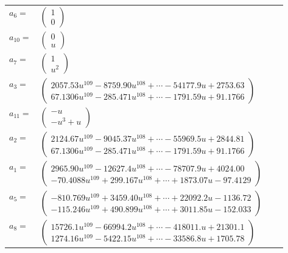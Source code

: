 \documentclass[1p]{elsarticle_modified}
\theoremstyle{definition}
\begin{document}
\begin{tabular}{m{7pt} m{180pt} m{7pt} m{180pt} }
\flushright $a_{6}=$&$\begin{pmatrix}1\\0\end{pmatrix}$ \\
\flushright $a_{10}=$&$\begin{pmatrix}0\\u\end{pmatrix}$ \\
\flushright $a_{7}=$&$\begin{pmatrix}1\\u^2\end{pmatrix}$ \\
\flushright $a_{3}=$&$\begin{pmatrix}2057.53 u^{109}-8759.90 u^{108}+\cdots-54177.9 u+2753.63\\67.1306 u^{109}-285.471 u^{108}+\cdots-1791.59 u+91.1766\end{pmatrix}$ \\
\flushright $a_{11}=$&$\begin{pmatrix}- u\\- u^3+u\end{pmatrix}$ \\
\flushright $a_{2}=$&$\begin{pmatrix}2124.67 u^{109}-9045.37 u^{108}+\cdots-55969.5 u+2844.81\\67.1306 u^{109}-285.471 u^{108}+\cdots-1791.59 u+91.1766\end{pmatrix}$ \\
\flushright $a_{1}=$&$\begin{pmatrix}2965.90 u^{109}-12627.4 u^{108}+\cdots-78707.9 u+4024.00\\-70.4088 u^{109}+299.167 u^{108}+\cdots+1873.07 u-97.4129\end{pmatrix}$ \\
\flushright $a_{5}=$&$\begin{pmatrix}-810.769 u^{109}+3459.40 u^{108}+\cdots+22092.2 u-1136.72\\-115.246 u^{109}+490.899 u^{108}+\cdots+3011.85 u-152.033\end{pmatrix}$ \\
\flushright $a_{8}=$&$\begin{pmatrix}15726.1 u^{109}-66994.2 u^{108}+\cdots-418011. u+21301.1\\1274.16 u^{109}-5422.15 u^{108}+\cdots-33586.8 u+1705.78\end{pmatrix}$ \\

\end{tabular}
\end{document}
